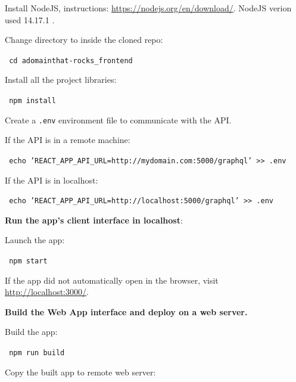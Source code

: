 \medskip

\noindent Install NodeJS, instructions: \url{https://nodejs.org/en/download/}. NodeJS verion used 14.17.1 .

\noindent Change directory to inside the cloned repo:

\noindent\colorbox{lightestgray}{
	\parbox{1\linewidth-9pt}{%
		\texttt{\tiny\faDollarSign\large\ cd adomainthat-rocks\_frontend}
	}%
}%

\medskip

\noindent Install all the project libraries:

\noindent\colorbox{lightestgray}{
	\parbox{1\linewidth-9pt}{%
		\texttt{\tiny\faDollarSign\large\ npm install}
	}%
}%

\medskip

\noindent Create a \texttt{.env} environment file to communicate with the \acrshort{API}.

\noindent If the \acrshort{API} is in a remote machine: 

\noindent\colorbox{lightestgray}{
	\parbox{1\linewidth-9pt}{%
		\texttt{\tiny\faDollarSign\large\ echo 'REACT\_APP\_API\_URL=http://mydomain.com:5000/graphql' >{}> .env}
	}%
}%

\medskip

\noindent If the \acrshort{API} is in localhost:

\noindent\colorbox{lightestgray}{
	\parbox{1\linewidth-9pt}{%
		\texttt{\tiny\faDollarSign\large\ echo 'REACT\_APP\_API\_URL=http://localhost:5000/graphql' >{}> .env}
	}%
}%
\bigskip

\noindent \textbf{Run the app's client interface in localhost}:

\noindent Launch the app:

\noindent\colorbox{lightestgray}{
	\parbox{1\linewidth-9pt}{%
		\texttt{\tiny\faDollarSign\large\ npm start}
	}%
}%

\medskip

\noindent If the app did not automatically open in the browser, visit \url{http://localhost:3000/}.
\bigskip

\noindent \textbf{Build the Web App interface and deploy on a web server.}

\noindent Build the app:

\noindent\colorbox{lightestgray}{
	\parbox{1\linewidth-9pt}{%
		\texttt{\tiny\faDollarSign\large\ npm run build}
	}%
}%

\medskip

\noindent Copy the built app to remote web server:


